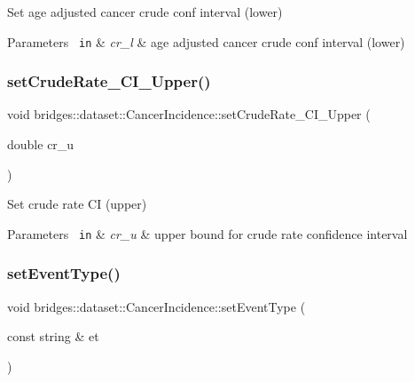 Set age adjusted cancer crude conf interval (lower)


\begin{DoxyParams}[1]{Parameters}
\mbox{\texttt{ in}}  & {\em cr\+\_\+l} & age adjusted cancer crude conf interval (lower) \\
\hline
\end{DoxyParams}
\mbox{\label{classbridges_1_1dataset_1_1_cancer_incidence_a9fa8b9c9fc4874e45d21612c817ed394}} 
\subsubsection{\texorpdfstring{setCrudeRate\_CI\_Upper()}{setCrudeRate\_CI\_Upper()}}
{\footnotesize\ttfamily void bridges\+::dataset\+::\+Cancer\+Incidence\+::set\+Crude\+Rate\+\_\+\+C\+I\+\_\+\+Upper (\begin{DoxyParamCaption}\item[{double}]{cr\+\_\+u }\end{DoxyParamCaption})\hspace{0.3cm}{\ttfamily [inline]}}



Set crude rate CI (upper) 


\begin{DoxyParams}[1]{Parameters}
\mbox{\texttt{ in}}  & {\em cr\+\_\+u} & upper bound for crude rate confidence interval \\
\hline
\end{DoxyParams}
\mbox{\label{classbridges_1_1dataset_1_1_cancer_incidence_aab3f76d957b69ef5fcefb491388e1d29}} 
\subsubsection{\texorpdfstring{setEventType()}{setEventType()}}
{\footnotesize\ttfamily void bridges\+::dataset\+::\+Cancer\+Incidence\+::set\+Event\+Type (\begin{DoxyParamCaption}\item[{const string \&}]{et }\end{DoxyParamCaption})\hspace{0.3cm}{\ttfamily [inline]}}



